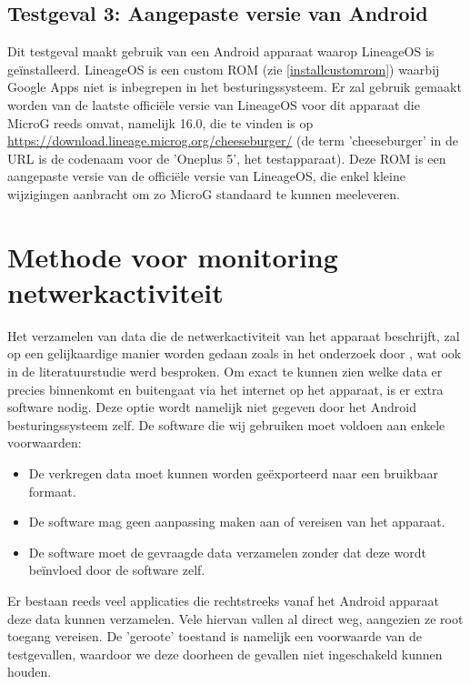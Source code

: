 \subsection{Testgeval 3: Aangepaste versie van Android}
\label{sec:testgeval3}
Dit testgeval maakt gebruik van een Android apparaat waarop LineageOS is geïnstalleerd. LineageOS is een custom ROM (zie \ref{installcustomrom}) waarbij Google Apps niet is inbegrepen in het besturingssysteem. Er zal gebruik gemaakt worden van de laatste officiële versie van LineageOS voor dit apparaat die MicroG reeds omvat, namelijk 16.0, die te vinden is op \url{https://download.lineage.microg.org/cheeseburger/} (de term 'cheeseburger' in de URL is de codenaam voor de 'Oneplus 5', het testapparaat). Deze ROM is een aangepaste versie van de officiële versie van LineageOS, die enkel kleine wijzigingen aanbracht om zo MicroG standaard te kunnen meeleveren.

\section{Methode voor monitoring netwerkactiviteit}
\label{sec:metingsoftware}
Het verzamelen van data die de netwerkactiviteit van het apparaat beschrijft, zal op een gelijkaardige manier worden gedaan zoals in het onderzoek door \cite{schmidt_google-data-collection}, wat ook in de literatuurstudie werd besproken. Om exact te kunnen zien welke data er precies binnenkomt en buitengaat via het internet op het apparaat, is er extra software nodig. Deze optie wordt namelijk niet gegeven door het Android besturingssysteem zelf. De software die wij gebruiken moet voldoen aan enkele voorwaarden:
\begin{itemize}
    \item De verkregen data moet kunnen worden geëxporteerd naar een bruikbaar formaat.
    \item De software mag geen aanpassing maken aan of vereisen van het apparaat.
    \item De software moet de gevraagde data verzamelen zonder dat deze wordt beïnvloed door de software zelf.
\end{itemize}
Er bestaan reeds veel applicaties die rechtstreeks vanaf het Android apparaat deze data kunnen verzamelen. Vele hiervan vallen al direct weg, aangezien ze root toegang vereisen. De 'geroote' toestand is namelijk een voorwaarde van de testgevallen, waardoor we deze doorheen de gevallen niet ingeschakeld kunnen houden. 

